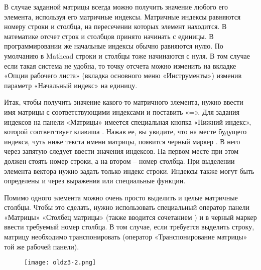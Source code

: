 В случае заданной матрицы всегда можно получить значение любого его элемента, используя его матричные индексы. Матричные индексы равняются номеру строки и столбца, на пересечении которых элемент находится. В математике отсчет строк и столбцов принято начинать с единицы. В программировании же начальные индексы обычно равняются нулю. По умолчанию в Mathcad строки и столбцы тоже начинаются с нуля. В том случае если такая система не удобна, то точку отсчета можно изменить на вкладке «Опции рабочего листа» (вкладка основного меню «Инструменты») изменив параметр «Начальный индекс» на единицу.

Итак, чтобы получить значение какого-то матричного элемента, нужно ввести имя матрицы с соответствующими индексами и поставить «=». Для задания индексов на панели «Матрицы» имеется специальная кнопка «Нижний индекс», которой соответствует клавиша \keys{[} . Нажав ее, вы увидите, что на месте будущего индекса, чуть ниже текста имени матрицы, появится черный маркер . В него через запятую следует ввести значения индексов. На первом месте при этом должен стоять номер строки, а на втором – номер столбца. При выделении элемента вектора нужно задать только индекс строки. Индексы также могут быть определены и через выражения или специальные функции.

Помимо одного элемента можно очень просто выделить и целые матричные столбцы. Чтобы это сделать, нужно использовать специальный оператор панели «Матрицы» «Столбец матрицы» (также вводится сочетанием  )  и в черный маркер ввести требуемый номер столбца. В том случае, если требуется выделить строку, матрицу необходимо транспонировать (оператор «Транспонирование матрицы» той же рабочей панели).

\begin{figure}[h]
	\begin{center}
		\texttt{[image: oldz3-2.png]}
	\end{center}
\end{figure}


